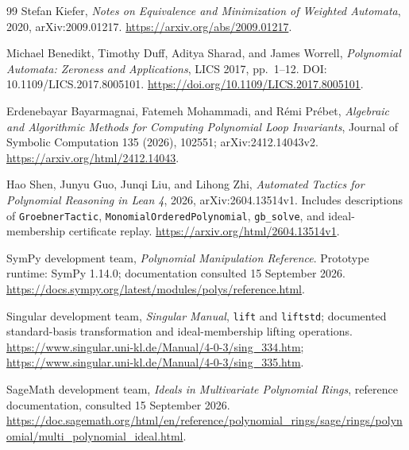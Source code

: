 \documentclass[11pt,letterpaper]{article}
\theoremstyle{definition}
\newcommand{\code}[1]{\nolinkurl{#1}}
\begin{document}
\begin{thebibliography}{99}
 Stefan Kiefer, \emph{Notes on Equivalence and Minimization of
Weighted Automata}, 2020, arXiv:2009.01217.
\url{https://arxiv.org/abs/2009.01217}.

 Michael Benedikt, Timothy Duff, Aditya Sharad, and
James Worrell, \emph{Polynomial Automata: Zeroness and Applications}, LICS 2017,
pp.~1--12. DOI: 10.1109/LICS.2017.8005101.
\url{https://doi.org/10.1109/LICS.2017.8005101}.

 Erdenebayar Bayarmagnai, Fatemeh Mohammadi,
and R\'emi Pr\'ebet, \emph{Algebraic and Algorithmic Methods for Computing
Polynomial Loop Invariants}, Journal of Symbolic Computation 135 (2026),
102551; arXiv:2412.14043v2.
\url{https://arxiv.org/html/2412.14043}.

 Hao Shen, Junyu Guo, Junqi Liu, and Lihong Zhi,
\emph{Automated Tactics for Polynomial Reasoning in Lean 4}, 2026,
arXiv:2604.13514v1. Includes descriptions of \code{GroebnerTactic},
\code{MonomialOrderedPolynomial}, \code{gb_solve}, and ideal-membership
certificate replay.
\url{https://arxiv.org/html/2604.13514v1}.

 SymPy development team, \emph{Polynomial Manipulation Reference}.
Prototype runtime: SymPy 1.14.0; documentation consulted 15 September 2026.
\url{https://docs.sympy.org/latest/modules/polys/reference.html}.

 Singular development team, \emph{Singular Manual},
\code{lift} and \code{liftstd}; documented standard-basis transformation and
ideal-membership lifting operations.
\url{https://www.singular.uni-kl.de/Manual/4-0-3/sing_334.htm};
\url{https://www.singular.uni-kl.de/Manual/4-0-3/sing_335.htm}.

 SageMath development team, \emph{Ideals in Multivariate
Polynomial Rings}, reference documentation, consulted 15 September 2026.
\url{https://doc.sagemath.org/html/en/reference/polynomial_rings/sage/rings/polynomial/multi_polynomial_ideal.html}.
\end{thebibliography}
\end{document}
